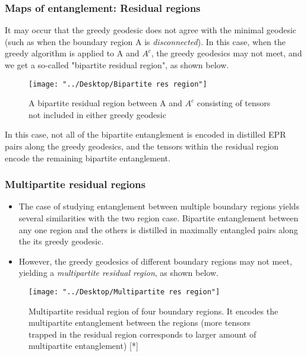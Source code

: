 \documentclass[11pt]{beamer}
\begin{document}
\begin{frame}
	
	\frametitle{Maps of entanglement: Residual regions}

	It may occur that the greedy geodesic does not agree with the minimal geodesic (such as when the boundary region A is \textit{disconnected}). In this case, when the greedy algorithm is applied to A and $A^c$, the greedy geodesics may not meet, and we get a so-called "bipartite residual region", as shown below.
	
	\begin{figure}
		\centering
		\texttt{[image: "../Desktop/Bipartite res region"]}
		\caption{A bipartite residual region between A and $A^c$ consisting of tensors not included in either greedy geodesic}
		\label{fig:bipartite-res-region}
	\end{figure}

	In this case, not all of the bipartite entanglement is encoded in distilled EPR pairs along the greedy geodesics, and the tensors within the residual region encode the remaining bipartite entanglement. 
	
\end{frame}


\begin{frame}
	
	\frametitle{Multipartite residual regions}
	
	\begin{itemize}
		\item The case of studying entanglement between multiple boundary regions yields several similarities with the two region case. Bipartite entanglement between any one region and the others is distilled in maximally entangled pairs along the its greedy geodesic. 
		
		\item 	However, the greedy geodesics of different boundary regions may not meet, yielding a \textit{multipartite residual region}, as shown below.
	\end{itemize}
	
	\begin{figure}
		\centering
		\texttt{[image: "../Desktop/Multipartite res region"]}
		\caption{Multipartite residual region of four boundary regions. It encodes the multipartite entanglement between the regions (more tensors trapped in the residual region corresponds to larger amount of multipartite entanglement) [*]}
		\label{fig:multipartite-res-region}
	\end{figure}
	
	
	
\end{frame}
\end{document}
